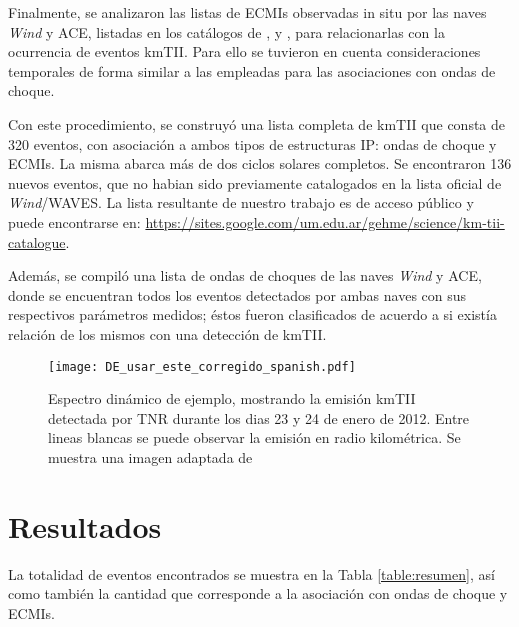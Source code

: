 \documentclass[baaa]{baaa}
\begin{document}
Finalmente, se analizaron las listas de ECMIs observadas in situ por las naves \textit{Wind} y ACE, listadas en los catálogos de \citet{NC18}, \citet{RC03} y \citet{RC10}, para relacionarlas con la ocurrencia de eventos kmTII. Para ello se tuvieron en cuenta consideraciones temporales de forma similar a las empleadas para las asociaciones con ondas de choque. 

Con este procedimiento, se construyó una lista completa de kmTII que consta de 320 eventos, con asociación a ambos tipos de estructuras IP: ondas de choque y ECMIs. La misma abarca más de dos ciclos solares completos. Se encontraron 136 nuevos eventos, que no habian sido previamente catalogados en la lista oficial de \textit{Wind}/WAVES. La lista resultante de nuestro trabajo es de acceso público y puede encontrarse en: \url{https://sites.google.com/um.edu.ar/gehme/science/km-tii-catalogue}.

Además, se compiló una lista de ondas de choques de las naves \textit{Wind} y ACE, donde se encuentran todos los eventos detectados por ambas naves con sus respectivos parámetros medidos; éstos fueron clasificados de acuerdo a si existía relación de los mismos con una detección de kmTII.

\begin{figure*}
\centering
\texttt{[image: DE\_usar\_este\_corregido\_spanish.pdf]}
\caption{Espectro dinámico de ejemplo, mostrando la emisión kmTII detectada por TNR durante los dias 23 y 24 de enero de 2012. Entre lineas blancas se puede observar la emisión en radio kilométrica. Se muestra una imagen adaptada de \cite{franco}}
\label{Fig1}
\end{figure*}




\section{Resultados}
La totalidad de eventos encontrados se muestra en la Tabla \ref{table:resumen}, así como también la cantidad que corresponde a la asociación con ondas de choque y ECMIs.
\end{document}
